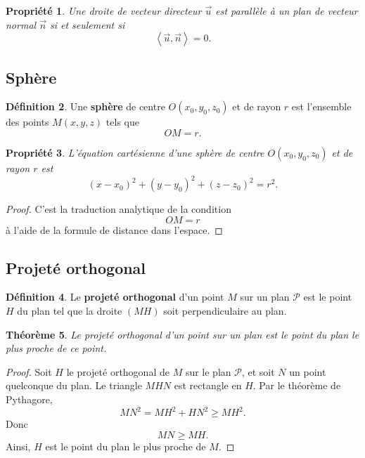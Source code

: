 \documentclass[11pt,a4paper]{article}
\newcommand{\ps}[2]{\left\langle #1,#2\right\rangle}
\newcommand{\uu}{\overrightarrow{u}}
\theoremstyle{definition}
\newtheorem{definition}{Définition}[section]
\theoremstyle{plain}
\newtheorem{propriete}[definition]{Propriété}
\newtheorem{theoreme}[definition]{Théorème}
\begin{document}
\begin{propriete}
Une droite de vecteur directeur $\uu$ est parallèle à un plan de vecteur normal $\overrightarrow{n}$ si et seulement si
\[
\ps{\uu}{\overrightarrow{n}}=0.
\]
\end{propriete}

\subsection{Sphère}

\begin{definition}
Une \textbf{sphère} de centre $O(x_0,y_0,z_0)$ et de rayon $r$ est l'ensemble des points $M(x,y,z)$ tels que
\[
OM=r.
\]
\end{definition}

\begin{propriete}
L'équation cartésienne d'une sphère de centre $O(x_0,y_0,z_0)$ et de rayon $r$ est
\[
(x-x_0)^2+(y-y_0)^2+(z-z_0)^2=r^2.
\]
\end{propriete}

\begin{proof}
C'est la traduction analytique de la condition
\[
OM=r
\]
à l'aide de la formule de distance dans l'espace.
\end{proof}

\subsection{Projeté orthogonal}

\begin{definition}
Le \textbf{projeté orthogonal} d'un point $M$ sur un plan $\mathcal P$ est le point $H$ du plan tel que la droite $(MH)$ soit perpendiculaire au plan.
\end{definition}

\begin{theoreme}
Le projeté orthogonal d'un point sur un plan est le point du plan le plus proche de ce point.
\end{theoreme}

\begin{proof}
Soit $H$ le projeté orthogonal de $M$ sur le plan $\mathcal P$, et soit $N$ un point quelconque du plan.
Le triangle $MHN$ est rectangle en $H$.
Par le théorème de Pythagore,
\[
MN^2=MH^2+HN^2\ge MH^2.
\]
Donc
\[
MN\ge MH.
\]
Ainsi, $H$ est le point du plan le plus proche de $M$.
\end{proof}
\end{document}
